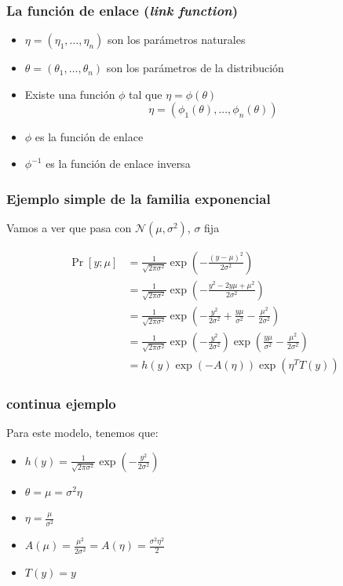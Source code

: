 \documentclass{beamer}
\begin{document}
\begin{frame}
  \frametitle{La función de enlace (\emph{link function})}

  \begin{itemize}
    \item $\eta = (\eta_1, \ldots, \eta_n)$ son los parámetros naturales
    \item $\theta = (\theta_1, \ldots, \theta_n)$ son los parámetros de la distribución
    \item Existe una función $\phi$ tal que $\eta = \phi(\theta)$
    $$\eta = (\phi_1(\theta), \ldots, \phi_n(\theta))$$
    \item $\phi$ es la función de enlace
    \item $\phi^{-1}$ es la función de enlace inversa
  \end{itemize}
\end{frame}

\begin{frame}
  \frametitle{Ejemplo simple de la familia exponencial}

  Vamos a ver que pasa con $\mathcal{N}(\mu, \sigma^2)$, $\sigma$ fija
  
  \begin{align*}
    \Pr[y; \mu] &= \frac{1}{\sqrt{2 \pi \sigma^2}} \exp\left(-\frac{(y - \mu)^2}{2 \sigma^2}\right) \\
      &= \frac{1}{\sqrt{2 \pi \sigma^2}} \exp\left(-\frac{y^2 - 2 y \mu + \mu^2}{2 \sigma^2}\right) \\
      &= \frac{1}{\sqrt{2 \pi \sigma^2}} \exp\left(-\frac{y^2}{2 \sigma^2} + \frac{y \mu}{\sigma^2} - \frac{\mu^2}{2 \sigma^2}\right) \\
      &= \frac{1}{\sqrt{2 \pi \sigma^2}} \exp\left(-\frac{y^2}{2 \sigma^2}\right) \exp\left(\frac{y \mu}{\sigma^2} - \frac{\mu^2}{2 \sigma^2}\right) \\
      &= h(y) \exp(-A(\eta)) \exp(\eta^T T(y))
  \end{align*}  
\end{frame}

\begin{frame}
  \frametitle{continua ejemplo}

  Para este modelo, tenemos que:
  \begin{itemize}
    \item $h(y) = \frac{1}{\sqrt{2 \pi \sigma^2}} \exp\left(-\frac{y^2}{2 \sigma^2}\right)$
    \item $\theta = \mu = \sigma^2 \eta$
    \item $\eta = \frac{\mu}{\sigma^2}$
    \item $A(\mu) = \frac{\mu^2}{2 \sigma^2} = A(\eta) = \frac{\sigma^2 \eta^2}{2}$
    \item $T(y) = y$
  \end{itemize}
  
\end{frame}
\end{document}
